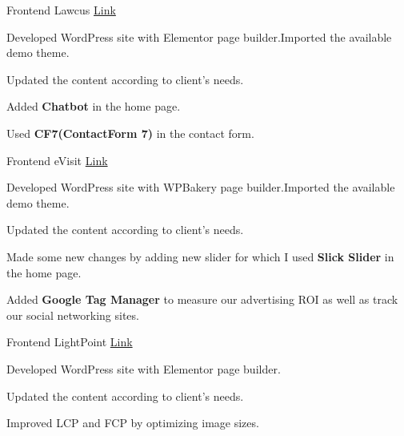 \begin{cventries}
  \cventry
    {Frontend} %
    {Lawcus} %
    {{\href{https://www.lawcus.com/}{Link}}} %
    {} %
    {
      \begin{cvitems} %
        \item {Developed WordPress site with Elementor page builder.Imported the available demo theme.}
        \item {Updated the content according to client's needs.}
        \item {Added \textbf{Chatbot} in the home page.}
        \item {Used \textbf{CF7(ContactForm 7)} in the contact form.}
      \end{cvitems}
    }


\cventry
    {Frontend} %
    {eVisit} %
    {{\href{https://www.evisit.com/}{Link}}} %
    {} %
    {
      \begin{cvitems} %
        \item {Developed WordPress site with WPBakery page builder.Imported the available demo theme.}
        \item {Updated the content according to client's needs.}
        \item {Made some new changes by adding new slider for which I used \textbf{Slick Slider} in the home page.}
        \item {Added \textbf{Google Tag Manager} to measure our advertising ROI as well as track our social networking sites.}
      \end{cvitems}
}


\cventry
    {Frontend} %
    {LightPoint} %
    {{\href{https://www.lightpointft.com/}{Link}}} %
    {} %
    {
      \begin{cvitems} %
        \item {Developed WordPress site with Elementor page builder.}
        \item {Updated the content according to client's needs.}
        \item {Improved LCP and FCP by optimizing image sizes.}
      \end{cvitems}
    }


\end{cventries}
